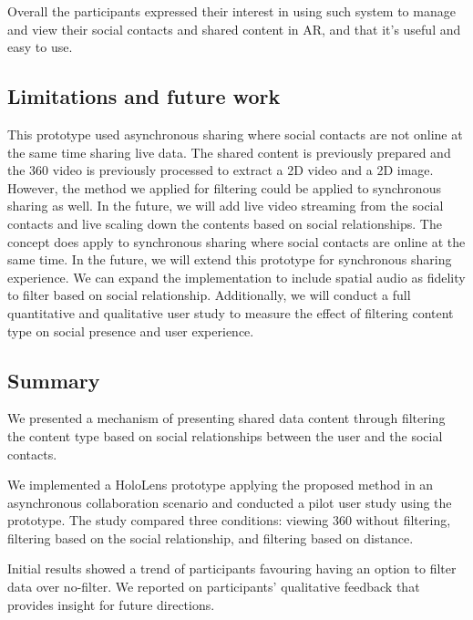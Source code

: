 Overall the participants expressed their interest in using such system to manage and view their social contacts and shared content in AR, and that it's useful and easy to use. 


\subsection{Limitations and future work}

This prototype used asynchronous sharing where social contacts are not online at the same time sharing live data. The shared content is previously prepared and the 360 video is previously processed to extract a 2D video and a 2D image. However, the method we applied for filtering could be applied to synchronous sharing as well. In the future, we will add live video streaming from the social contacts and live scaling down the contents based on social relationships. 
The concept does apply to synchronous sharing where social contacts are online at the same time. In the future, we will extend this prototype for synchronous sharing experience. We can expand the implementation to include spatial audio as fidelity to filter based on social relationship. 
Additionally, we will conduct a full quantitative and qualitative user study to measure the effect of filtering content type on social presence and user experience. 

\subsection{Summary}

We presented a mechanism of presenting shared data content through filtering the content type based on social relationships between the user and the social contacts. 

We implemented a HoloLens prototype applying the proposed method in an asynchronous collaboration scenario and conducted a pilot user study using the prototype. The study compared three conditions: viewing 360 without filtering, filtering based on the social relationship, and filtering based on distance. 

Initial results showed a trend of participants favouring having an option to filter data over no-filter. We reported on participants' qualitative feedback that provides insight for future directions. 
